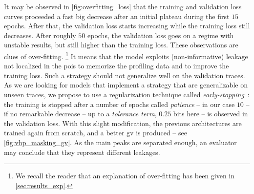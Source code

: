 It may be observed in \autoref{fig:overfitting_loss} that the training and validation loss curves proceeded a fast big decrease after an initial plateau during the first \(15\) epochs.
After that, the validation loss starts increasing while the training loss still decreases.
After roughly \(50\) epochs, the validation loss goes on a regime with unstable results, but still higher than the training loss.
These observations are clues of over-fitting.%
\footnote{
    We recall the reader that an explanation of over-fitting has been given in \autoref{sec:results_exp}.
}
It means that the model exploits (non-informative) leakage not localized in the \glspl{poi} to memorize the profiling data and to improve the training loss.
Such a strategy should not generalize well on the validation traces.
As we are looking for models that implement a strategy that are generalizable on unseen traces, we propose to use a regularization technique called \emph{early-stopping}~\cite{goodfellow_deep_2017}: the training is stopped after a number of epochs called \emph{patience} -- in our case \(10\) -- if no remarkable decrease -- \ie{} up to a 
\emph{tolerance term}, \(0.25\) bits here -- is observed in the validation loss. 
With this slight modification, the previous architectures are trained again from scratch, and a better \gls{gv} is produced -- see \autoref{fig:vbp_masking_gv}.
As the main peaks are separated enough, an evaluator may conclude that they represent different leakages.

